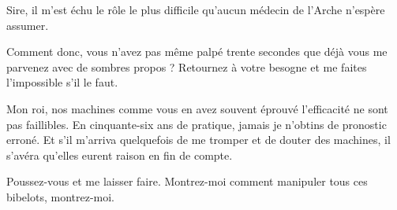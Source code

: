 \begin{drama}
  \medecinspeaks Sire, il m’est échu le rôle le plus difficile qu’aucun médecin de l’Arche n’espère assumer. 

  \roispeaks Comment donc, vous n’avez pas même palpé trente secondes que déjà vous me parvenez avec de sombres propos ? Retournez à votre besogne et me faites l’impossible s’il le faut.

  \medecinspeaks Mon roi, nos machines comme vous en avez souvent éprouvé l’efficacité ne sont pas faillibles. En cinquante-six ans de pratique, jamais je n’obtins de pronostic erroné. Et s’il m’arriva quelquefois de me tromper et de douter des machines, il s’avéra qu’elles eurent raison en fin de compte.

  \roispeaks {} Poussez-vous et me laisser faire.  Montrez-moi comment manipuler tous ces bibelots, montrez-moi.

\end{drama}


\scene

\StageDirII{\elena, \reine}



